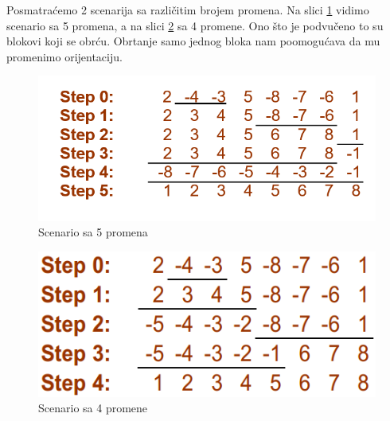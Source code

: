 Posmatraćemo 2 scenarija sa različitim brojem promena. Na slici \ref{slika: 5 promena} vidimo scenario sa 5 promena, a na slici \ref{slika: 4 promene} sa 4 promene. Ono što je podvučeno to su blokovi koji se obrću. Obrtanje samo jednog bloka nam poomogućava da mu promenimo orijentaciju.


\begin{minipage}{\textwidth}
	\centering
	\begin{minipage}{0.5\textwidth} 
		\begin{figure}[H]
			\centering
			\includegraphics[width=\textwidth]{poglavlja/6/slike/scenario5.PNG}
			\caption{Scenario sa 5 promena}
			\label{slika: 5 promena}
		\end{figure}
		
	\end{minipage}
	\hfill 
	\begin{minipage}{0.4\textwidth}
		\begin{figure}[H]
			\centering
			\includegraphics[width=\textwidth]{poglavlja/6/slike/scenario4.PNG}
			\caption{Scenario sa 4 promene}
			\label{slika: 4 promene}
		\end{figure}
		
	\end{minipage}
	\vspace*{1em}
\end{minipage}





